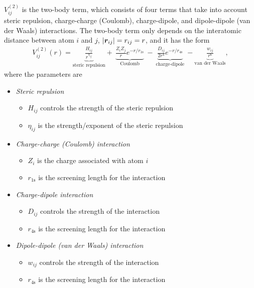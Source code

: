 $V_{ij}^{(2)}$ is the two-body term, which consists of four terms that take into account steric repulsion, charge-charge (Coulomb), charge-dipole, and dipole-dipole (van der Waals) interactions. The two-body term only depends on the interatomic distance between atom $i$ and $j$, $|\boldsymbol{r}_{ij}| = r_{ij} = r$, and it has the form%
\begin{align*}
    V_{ij}^{(2)} (r) = 
    \underbrace{
        \frac{H_{ij}}{r^{\eta_{ij}}}
    }_{\text{steric repulsion}}
    +~ 
    \underbrace{
        \frac{Z_iZ_j}{r}e^{-r/r_{1\text{s}}}
    }_{\text{Coulomb}}
    ~-~
    \underbrace{
        \frac{D_{ij}}{2r^4}e^{-r/r_{4\text{s}}}
    }_{\text{charge-dipole}}
    ~- 
    \underbrace{
        \frac{w_{ij}}{r^6}
    }_{\text{van der Waals}}
    ,
\end{align*}%
where the parameters are%
\begin{itemize}[%
    leftmargin=*,%
    label={}%
]
    \item \textit{Steric repulsion}
    \begin{itemize}[label=$\bullet$]
        \item $H_{ij}$ controls the strength of the steric repulsion
        \item $\eta_{ij}$ is the strength/exponent of the steric repulsion
    \end{itemize}
    \item \textit{Charge-charge (Coulomb) interaction}
    \begin{itemize}[label=$\bullet$]
        \item $Z_i$ is the charge associated with atom $i$
        \item $r_{1\text{s}}$ is the screening length for the interaction
    \end{itemize}
    \item \textit{Charge-dipole interaction}
    \begin{itemize}[label=$\bullet$]
        \item $D_{ij}$ controls the strength of the interaction
        \item $r_{4\text{s}}$ is the screening length for the interaction
    \end{itemize}
    \item \textit{Dipole-dipole (van der Waals) interaction}
    \begin{itemize}[label=$\bullet$]
        \item $w_{ij}$ controls the strength of the interaction
        \item $r_{4\text{s}}$ is the screening length for the interaction
    \end{itemize}
    \vspace{10pt}
\end{itemize}

